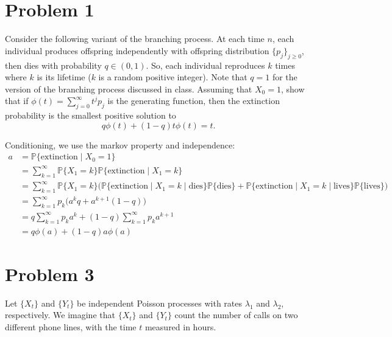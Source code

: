 \documentclass[11pt]{article}
\newcommand{\bbP}{\mathbb{P}}
\begin{document}
	
	
	\psetheader
\section*{Problem 1}
\begin{problem}
    Consider the following variant of the branching process. At each time \( n \), each individual produces offspring independently with offspring distribution \(\{p_j\}_{j \geq 0}\), then dies with probability \( q \in (0,1) \). So, each individual reproduces \( k \) times where \( k \) is its lifetime (\( k \) is a random positive integer). Note that \( q = 1 \) for the version of the branching process discussed in class. Assuming that \( X_0 = 1 \), show that if \( \phi(t) = \sum_{j=0}^\infty t^j p_j \) is the generating function, then the extinction probability is the smallest positive solution to
\[
q\phi(t) + (1-q)t\phi(t) = t.
\]

\end{problem}
\begin{solution}
Conditioning, we use the markov property and independence:
\begin{align*}
  a &= \bbP\{\text{extinction} \mid X_0 = 1\}\\ &= \sum_{k=1}^\infty \bbP\{X_1 = k\}\bbP\{\text{extinction} \mid X_1 = k \} \\
  &=  \sum_{k=1}^\infty \bbP\{X_1 = k\}\bigg(\bbP\{\text{extinction} \mid X_1 = k  \mid \text{dies}\}\bbP\{\text{dies}\} + \bbP\{\text{extinction} \mid X_1 = k  \mid \text{lives}\}\bbP\{\text{lives}\}  \bigg) \\
  &=\sum_{k=1}^\infty p_k \big(a^{k} q + a^{k+1}(1-q)\big)\\
  &= q\sum_{k=1}^\infty p_k a^k + (1-q)\sum_{k=1}^\infty p_ka^{k+1}\\
  &= q\phi(a) + (1-q)a \phi(a)
\end{align*}

\end{solution}



\newpage
\section*{Problem 3}
Let \(\{X_t\}\) and \(\{Y_t\}\) be independent Poisson processes with rates \(\lambda_1\) and \(\lambda_2\), respectively. We imagine that \(\{X_t\}\) and \(\{Y_t\}\) count the number of calls on two different phone lines, with the time \(t\) measured in hours.
\end{document}
